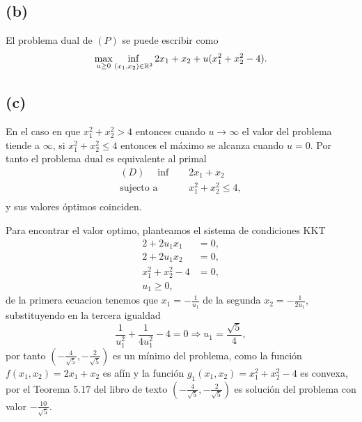 \subsection*{(b)}

El problema dual de $(P)$ se puede escribir como
\begin{equation*}
    \max_{u \geq 0} \inf_{(x_1, x_2) \in \mathbb{R}^2} 2 x_1 + x_2 + u ( x_1^2 + x_2^2 - 4 ).
\end{equation*}


\subsection*{(c)}

En el caso en que $x_1^2 + x_2^2 > 4$ entonces cuando $u \rightarrow \infty$ el valor del problema tiende a $\infty$,
si $x_1^2 + x_2^2 \leq 4$ entonces el máximo se alcanza cuando $u = 0$.
Por tanto el problema dual es equivalente al primal
\begin{equation*}
\begin{aligned}
    (D) \quad \inf \quad & 2 x_1 + x_2 \\
    \text{sujecto a} \quad & x_1^2 + x_2^2 \leq 4, \\
\end{aligned}
\end{equation*}
y sus valores óptimos coinciden.

Para encontrar el valor optimo,
planteamos el sistema de condiciones KKT
\begin{equation*}
\begin{aligned}
    2 + 2 u_1 x_1 & = 0, \\
    2 + 2 u_1 x_2 & = 0, \\
    x_1^2 + x_2^2 - 4 & = 0, \\
    u_1 \geq 0,
\end{aligned}
\end{equation*}
de la primera ecuacion tenemos que $x_1 = -\frac{1}{u_1}$ de la segunda $x_2 = -\frac{1}{2 u_1}$,
substituyendo en la tercera igualdad
\begin{equation*}
    \frac{1}{u_1^2} + \frac{1}{4 u_1^2} - 4 = 0
    \Rightarrow u_1 = \frac{\sqrt{5}}{4},
\end{equation*}
por tanto $\left( -\frac{4}{\sqrt{5}}, -\frac{2}{\sqrt{5}} \right)$ es un mínimo del problema,
como la función $f(x_1, x_2) = 2 x_1 + x_2$ es afín y la función $g_1(x_1, x_2) = x_1^2 + x_2^2 - 4$ es convexa,
por el Teorema 5.17 del libro de texto $\left( -\frac{4}{\sqrt{5}}, -\frac{2}{\sqrt{5}} \right)$ es solución del problema con valor $-\frac{10}{\sqrt{5}}$.
